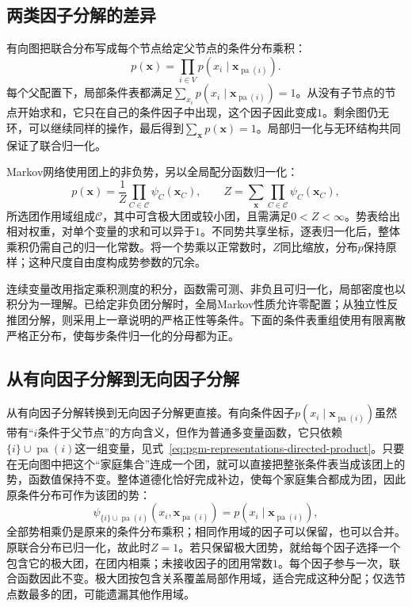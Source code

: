 \subsection{两类因子分解的差异}
\label{sec:pgm-representations-normalization}

有向图把联合分布写成每个节点给定父节点的条件分布乘积：
\begin{equation}
  p(\bm{x})=\prod_{i\in V}
  p(x_i\mid\bm{x}_{\operatorname{pa}(i)}).
  \label{eq:pgm-representations-directed-product}
\end{equation}
每个父配置下，局部条件表都满足$\sum_{x_i}p(x_i\mid\bm{x}_{\operatorname{pa}(i)})=1$。从没有子节点的节点开始求和，它只在自己的条件因子中出现，这个因子因此变成$1$。剩余图仍无环，可以继续同样的操作，最后得到$\sum_{\bm{x}}p(\bm{x})=1$。局部归一化与无环结构共同保证了联合归一化。

Markov网络使用团上的非负势，另以全局配分函数归一化：
\begin{equation}
  p(\bm{x})=\frac{1}{Z}
  \prod_{C\in\mathcal{C}}\psi_C(\bm{x}_C),
  \qquad
  Z=\sum_{\bm{x}}\prod_{C\in\mathcal{C}}\psi_C(\bm{x}_C),
  \label{eq:pgm-representations-undirected-product}
\end{equation}
所选团作用域组成$\mathcal{C}$，其中可含极大团或较小团，且需满足$0<Z<\infty$。势表给出相对权重，对单个变量的求和可以异于$1$。不同势共享坐标，逐表归一化后，整体乘积仍需自己的归一化常数。将一个势乘以正常数时，$Z$同比缩放，分布$p$保持原样；这种尺度自由度构成势参数的冗余。

连续变量改用指定乘积测度的积分，函数需可测、非负且可归一化，局部密度也以积分为一理解。已给定非负团分解时，全局Markov性质允许零配置；从独立性反推团分解，则采用上一章说明的严格正性等条件。下面的条件表重组使用有限离散严格正分布，使每步条件归一化的分母都为正。

\subsection{从有向因子分解到无向因子分解}
\label{sec:pgm-representations-directed-to-undirected}

从有向因子分解转换到无向因子分解更直接。有向条件因子$p(x_i\mid\bm{x}_{\operatorname{pa}(i)})$虽然带有“$i$条件于父节点”的方向含义，但作为普通多变量函数，它只依赖$\{i\}\cup\operatorname{pa}(i)$这一组变量，见式~\eqref{eq:pgm-representations-directed-product}。只要在无向图中把这个“家庭集合”连成一个团，就可以直接把整张条件表当成该团上的势，函数值保持不变。整体道德化恰好完成补边，使每个家庭集合都成为团，因此原条件分布可作为该团的势：
\[
  \psi_{\{i\}\cup\operatorname{pa}(i)}
  (x_i,\bm{x}_{\operatorname{pa}(i)})
  =
  p(x_i\mid\bm{x}_{\operatorname{pa}(i)}),
\]
全部势相乘仍是原来的条件分布乘积；相同作用域的因子可以保留，也可以合并。原联合分布已归一化，故此时$Z=1$。若只保留极大团势，就给每个因子选择一个包含它的极大团，在团内相乘；未接收因子的团用常数$1$。每个因子参与一次，联合函数因此不变。极大团按包含关系覆盖局部作用域，适合完成这种分配；仅选节点数最多的团，可能遗漏其他作用域。

